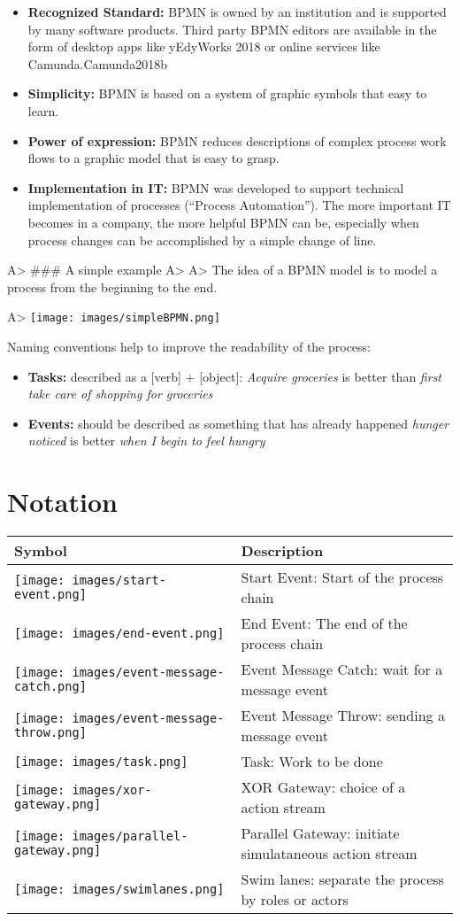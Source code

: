 \documentclass[]{book}
\begin{document}
\begin{itemize}
\item
  \textbf{Recognized Standard:} BPMN is owned by an institution and is supported by many software products. Third party BPMN editors are available in the form of desktop apps like yEd\protect\hypertarget{YED2018}{}{yWorks 2018} or online services like Camunda.\protect\hypertarget{Camunda2018b}{}{Camunda2018b}
\item
  \textbf{Simplicity:} BPMN is based on a system of graphic symbols that easy to learn.
\item
  \textbf{Power of expression:} BPMN reduces descriptions of complex process work flows to a graphic model that is easy to grasp.
\item
  \textbf{Implementation in IT:} BPMN was developed to support technical implementation of processes (``Process Automation''). The more important IT becomes in a company, the more helpful BPMN can be, especially when process changes can be accomplished by a simple change of line.
\end{itemize}

A\textgreater{} \#\#\# A simple example
A\textgreater{}
A\textgreater{} The idea of a BPMN model is to model a process from the beginning to the end.

A\textgreater{} \texttt{[image: images/simpleBPMN.png]}

Naming conventions help to improve the readability of the process:

\begin{itemize}
\item
  \textbf{Tasks:} described as a {[}verb{]} + {[}object{]}: \emph{Acquire groceries} is better than \emph{first take care of shopping for groceries}
\item
  \textbf{Events:} should be described as something that has already happened \emph{hunger noticed} is better \emph{when I begin to feel hungry}
\end{itemize}

\hypertarget{notation}{%
\section{Notation}\label{notation}}

\begin{longtable}[]{@{}ll@{}}
\toprule
Symbol & Description\tabularnewline
\midrule
\endhead
\texttt{[image: images/start-event.png]} & Start Event: Start of the process chain\tabularnewline
\texttt{[image: images/end-event.png]} & End Event: The end of the process chain\tabularnewline
\texttt{[image: images/event-message-catch.png]} & Event Message Catch: wait for a message event\tabularnewline
\texttt{[image: images/event-message-throw.png]} & Event Message Throw: sending a message event\tabularnewline
\texttt{[image: images/task.png]} & Task: Work to be done\tabularnewline
\texttt{[image: images/xor-gateway.png]} & XOR Gateway: choice of a action stream\tabularnewline
\texttt{[image: images/parallel-gateway.png]} & Parallel Gateway: initiate simulataneous action stream\tabularnewline
\texttt{[image: images/swimlanes.png]} & Swim lanes: separate the process by roles or actors\tabularnewline
\bottomrule
\end{longtable}
\end{document}
